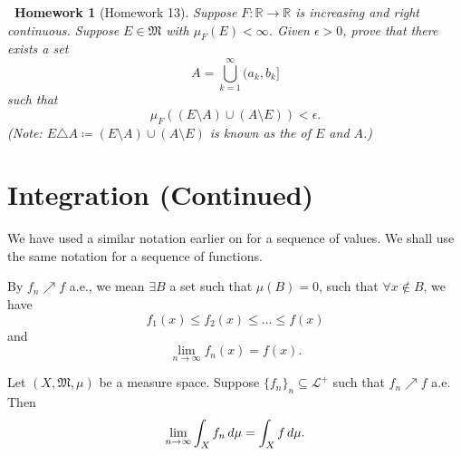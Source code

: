 \documentclass[notoc,notitlepage]{tufte-book}
\newtheorem*{homework}{\faCogs\ Homework}
\begin{document}
\begin{homework}[Homework 13]\label{homework:13}
  Suppose $F : \mathbb{R} \to \mathbb{R}$ is
  increasing and right continuous.
  Suppose $E \in \mathfrak{M}$ with $\mu_F(E) < \infty$.
  Given $\epsilon > 0$, prove that there exists a set
  \begin{equation*}
    A = \bigcup_{k=1}^{\infty} (a_k, b_k]
  \end{equation*}
  such that
  \begin{equation*}
    \mu_F((E \setminus A) \cup (A \setminus E)) < \epsilon.
  \end{equation*}
  (Note: $E \triangle A \coloneqq (E \setminus A) \cup (A \setminus E)$
  is known as the  of $E$ and $A$.)
\end{homework}

\section{Integration (Continued)}%
\label{sec:integration_continued}

\begin{notation}
  We have used a similar notation earlier on
  for a sequence of values.
  We shall use the same notation for a sequence of functions.

  By $f_n \nearrow f$ a.e., we mean
  $\exists B$ a set such that $\mu(B) = 0$,
  such that $\forall x \notin B$, we have
  \begin{equation*}
    f_1(x) \leq f_2(x) \leq \hdots \leq f(x)
  \end{equation*}
  and
  \begin{equation*}
    \lim_{n \to \infty} f_n(x) = f(x).
  \end{equation*}
\end{notation}

\begin{crly}\label{crly:monotone_convergence_theorem_a_e_ver_}
  Let $(X, \mathfrak{M}, \mu)$ be a measure space.
  Suppose $\{ f_n \}_n \subseteq \mathcal{L}^+$
  such that $f_n \nearrow f$ a.e.
  Then
  \begin{equation*}
    \lim_{n \to \infty} \int_X f_n \mathop{}\!d{\mu} = \int_{X} f \mathop{}\!d{\mu}.
  \end{equation*}
\end{crly}
\end{document}
